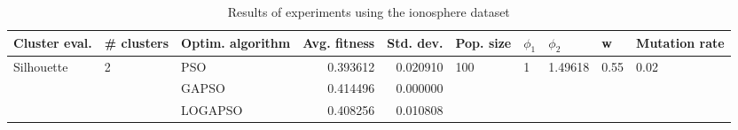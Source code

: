 \begin{table}
\centering
\caption{Results of experiments using the ionosphere dataset}
\begin{tabular}{lllrrlllll}
\toprule
              Cluster eval. &        \# clusters & Optim. algorithm &  Avg. fitness &  Std. dev. &            Pop. size &         $\phi_{1}$ &               $\phi_{2}$ &                     w &         Mutation rate \\
\midrule
\multirow{3}{*}{Silhouette} & \multirow{3}{*}{2} &              PSO &      0.393612 &   0.020910 & \multirow{3}{*}{100} & \multirow{3}{*}{1} & \multirow{3}{*}{1.49618} & \multirow{3}{*}{0.55} & \multirow{3}{*}{0.02} \\
                            &                    &            GAPSO &      0.414496 &   0.000000 &                      &                    &                          &                       &                       \\
                            &                    &          LOGAPSO &      0.408256 &   0.010808 &                      &                    &                          &                       &                       \\
\bottomrule
\end{tabular}
\end{table}
